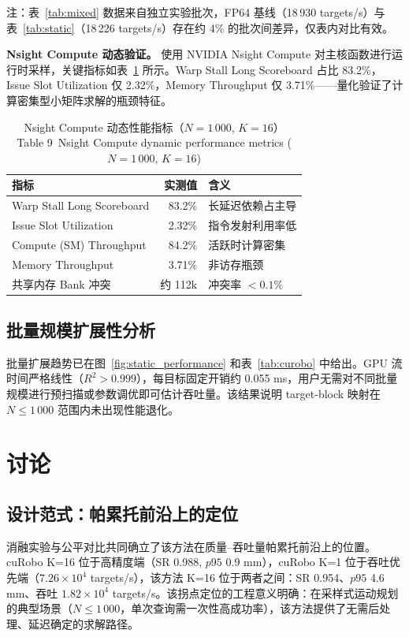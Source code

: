 \documentclass[twocolumn,a4paper,10pt]{ctexart}
\begin{document}
{\footnotesize 注：表~\ref{tab:mixed} 数据来自独立实验批次，FP64 基线（18\,930 targets/s）与表~\ref{tab:static}（18\,226 targets/s）存在约 4\% 的批次间差异，仅表内对比有效。}

\textbf{Nsight Compute 动态验证。} 使用 NVIDIA Nsight Compute\cite{ncu} 对主核函数进行运行时采样，关键指标如表~\ref{tab:ncu} 所示。Warp Stall Long Scoreboard 占比 83.2\%，Issue Slot Utilization 仅 2.32\%，Memory Throughput 仅 3.71\%——量化验证了计算密集型小矩阵求解的瓶颈特征。

\begin{table}[htbp]
\centering
\caption{Nsight Compute 动态性能指标（$N=1\,000$, $K=16$）\\[2pt] {\small Table 9~Nsight Compute dynamic performance metrics ($N=1\,000$, $K=16$)}}
\label{tab:ncu}
\footnotesize
\begin{tabular}{lrl}
\toprule
指标 & 实测值 & 含义\\
\midrule
Warp Stall Long Scoreboard & 83.2\% & 长延迟依赖占主导\\
Issue Slot Utilization & 2.32\% & 指令发射利用率低\\
Compute (SM) Throughput & 84.2\% & 活跃时计算密集\\
Memory Throughput & 3.71\% & 非访存瓶颈\\
共享内存 Bank 冲突 & 约 112k & 冲突率 $<0.1\%$\\
\bottomrule
\end{tabular}
\end{table}

\subsection{批量规模扩展性分析}

批量扩展趋势已在图~\ref{fig:static_performance} 和表~\ref{tab:curobo} 中给出。GPU 流时间严格线性（$R^2>0.999$），每目标固定开销约 0.055 ms，用户无需对不同批量规模进行预扫描或参数调优即可估计吞吐量。该结果说明 target-block 映射在 $N\le1\,000$ 范围内未出现性能退化。

\FloatBarrier
\section{讨论}

\subsection{设计范式：帕累托前沿上的定位}

消融实验与公平对比共同确立了该方法在质量--吞吐量帕累托前沿上的位置。cuRobo K=16 位于高精度端（SR 0.988, $p95$ 0.9 mm），cuRobo K=1 位于吞吐优先端（$7.26\times10^4$ targets/s），该方法 K=16 位于两者之间：SR 0.954、$p95$ 4.6 mm、吞吐 $1.82\times10^4$ targets/s。该拐点定位的工程意义明确：在采样式运动规划的典型场景（$N\le1\,000$，单次查询需一次性高成功率），该方法提供了无需后处理、延迟确定的求解路径。
\end{document}
